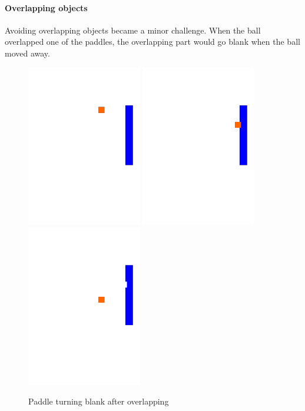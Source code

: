 \paragraph{Overlapping objects} 
Avoiding overlapping objects became a minor challenge. When the ball overlapped one of the paddles, the overlapping part would go blank when the ball moved away.
\begin{figure}[h]
	\label{fig:pong_overlapping}
	\includegraphics[width=5cm, trim= 0 240 0 100]{img/pong_overlapping_0.pdf}
	\includegraphics[width=5cm, trim= 0 240 0 100]{img/pong_overlapping_1.pdf}
	\includegraphics[width=5cm, trim= 0 240 0 100]{img/pong_overlapping_2.pdf}
	
	\caption{Paddle turning blank after overlapping}
\end{figure}
